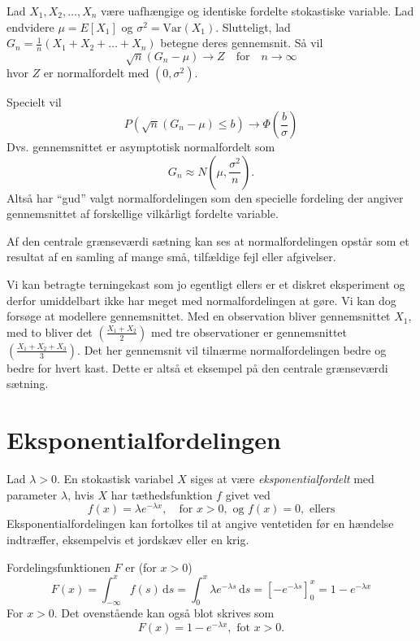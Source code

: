 \begin{sæt} 
  Lad $X_1, X_2, \ldots, X_n$ være uafhængige og identiske fordelte stokastiske variable. Lad endvidere $\mu = E[X_1]$ og $\sigma^2 = \mathrm{Var}(X_1)$. Slutteligt, lad $G_n = \frac{1}{n}(X_1 + X_2 + \ldots + X_n)$ betegne deres gennemsnit. Så vil
  \[ 
  \sqrt{n}(G_n - \mu) \to Z \quad \text{for} \quad n \to \infty
  \]
  hvor $Z$ er normalfordelt med $(0, \sigma^2)$.

  Specielt vil
  \[ 
  P \left( \sqrt{n} \left( G_n - \mu\right) \leq b \right) \to \Phi\left(\frac{b}{\sigma}\right)
  \]
  Dvs. gennemsnittet er asymptotisk normalfordelt som
  \[ 
  G_n \approx N\left(\mu, \frac{\sigma^2}{n} \right)
  .\]
  \bigbreak
  Altså har ``gud'' valgt normalfordelingen som den specielle fordeling der angiver gennemsnittet af forskellige vilkårligt fordelte variable.
\end{sæt}

 Af den centrale grænseværdi sætning kan ses at normalfordelingen opstår som et resultat af en samling af mange små, tilfældige fejl eller afgivelser. 

Vi kan betragte terningekast som jo egentligt ellers er et diskret eksperiment og derfor umiddelbart ikke har meget med normalfordelingen at gøre. Vi kan dog forsøge at modellere gennemsnittet. Med en observation bliver gennemsnittet $X_1$, med to bliver det $\left( \frac{X_1 + X_2}{2} \right)$ med tre observationer er gennemsnittet $\left( \frac{X_1 + X_2 + X_3}{3} \right)$. Det her gennemsnit vil tilnærme normalfordelingen bedre og bedre for hvert kast. Dette er altså et eksempel på den centrale grænseværdi sætning.


\section{Eksponentialfordelingen} \label{afs:foreks}
\begin{definition} [Eksponentialfordelingen]
  Lad $\lambda > 0$. En stokastisk variabel $X$ siges at være \textit{eksponentialfordelt} med parameter $\lambda$, hvis $X$ har tæthedsfunktion $f$ givet ved
  \[ 
  f(x) = \lambda e^{-\lambda x}, \quad \text{for } x>0, \text{ og } f(x) = 0, \text{ ellers}
  \]
  Eksponentialfordelingen kan fortolkes til at angive ventetiden før en hændelse indtræffer, eksempelvis et jordskæv eller en krig.
\end{definition}

\begin{sæt} 
  Fordelingsfunktionen $F$ er (for $x>0$)
  \[ 
  F(x) = \int_{-\infty}^{x} f(s) \, \mathrm{d}s = \int_{0}^{x} \lambda e^{-\lambda s} \, \mathrm{d}s = \left[ -e^{-\lambda s} \right]_0^{x} = 1 - e^{-\lambda x}
  \]
  For $x > 0$. Det ovenstående kan også blot skrives som
  \[ 
  F(x) = 1 - e^{-\lambda x}, \text{ fot } x>0
  .\]
\end{sæt}

